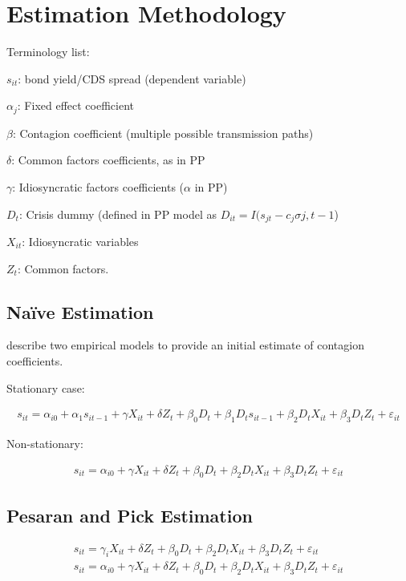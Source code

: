 \documentclass[../base.tex]{subfiles}
\begin{document}
\section{Estimation Methodology}

Terminology list:

$s_{it}$: bond yield/CDS spread (dependent variable)

$\alpha_j$: Fixed effect coefficient

$\beta$: Contagion coefficient (multiple possible transmission paths)

$\delta$: Common factors coefficients, as in PP

$\gamma$: Idiosyncratic factors coefficients ($\alpha$ in PP)

$D_t$: Crisis dummy (defined in PP model as $D_{it} = I(s_{jt} - c_j\sigma{j, t-1}$)

$X_{it}$: Idiosyncratic variables

$Z_t$: Common factors. 

\subsection{Na\"{i}ve Estimation}

\cite{giordano2013pure} describe two empirical models to provide an initial estimate of contagion coefficients. 

Stationary case:

\begin{align}
	s_{it} = \alpha_{i0} + \alpha_{1}s_{it-1} +\gamma X_{it} + \delta Z_t + \beta_0D_t + \beta_1D_ts_{it-1} + \beta_2D_tX_{it} + \beta_3D_tZ_t + \varepsilon_{it}
\end{align}

Non-stationary:

\begin{align}
	s_{it} = \alpha_{i0} + \gamma X_{it} + \delta Z_t + \beta_0D_t + \beta_2D_tX_{it} + \beta_3D_tZ_t + \varepsilon_{it}
\end{align}


\subsection{Pesaran and Pick Estimation}

\begin{align}
	s_{it} = \gamma_i X_{it} + \delta Z_t + \beta_0D_t + \beta_2D_tX_{it} + \beta_3D_tZ_t + \varepsilon_{it} \\
	
	s_{it} = \alpha_{i0} + \gamma X_{it} + \delta Z_t + \beta_0D_t + \beta_2D_tX_{it} + \beta_3D_tZ_t + \varepsilon_{it} 
\end{align}
\end{document}
